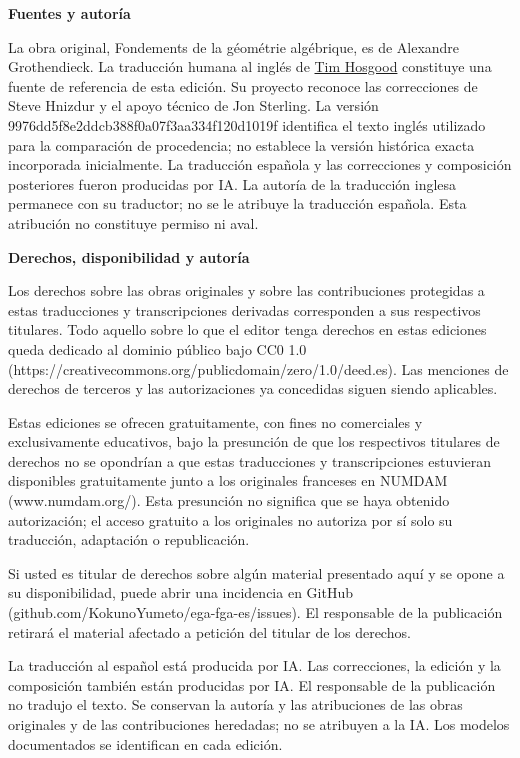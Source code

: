 \documentclass[11pt,twoside,openany]{book}
\numberwithin{equation}{section}
\theoremstyle{plain}
\theoremstyle{definition}
\theoremstyle{remark}
\theoremstyle{plain}
\theoremstyle{definition}
\theoremstyle{remark}
\begin{document}
\begingroup
\small
\noindent\textbf{Fuentes y autoría}

La obra original, Fondements de la géométrie algébrique, es de Alexandre Grothendieck. La traducción humana al inglés de \href{https://github.com/thosgood/fga/tree/9976dd5f8e2ddcb388f0a07f3aa334f120d1019f}{Tim Hosgood} constituye una fuente de referencia de esta edición. Su proyecto reconoce las correcciones de Steve Hnizdur y el apoyo técnico de Jon Sterling. La versión 9976dd5f8e2ddcb388f0a07f3aa334f120d1019f identifica el texto inglés utilizado para la comparación de procedencia; no establece la versión histórica exacta incorporada inicialmente. La traducción española y las correcciones y composición posteriores fueron producidas por IA. La autoría de la traducción inglesa permanece con su traductor; no se le atribuye la traducción española. Esta atribución no constituye permiso ni aval.

\noindent\textbf{Derechos, disponibilidad y autoría}

Los derechos sobre las obras originales y sobre las contribuciones protegidas a estas traducciones y transcripciones derivadas corresponden a sus respectivos titulares. Todo aquello sobre lo que el editor tenga derechos en estas ediciones queda dedicado al dominio público bajo CC0 1.0 (https://creativecommons.org/publicdomain/zero/1.0/deed.es). Las menciones de derechos de terceros y las autorizaciones ya concedidas siguen siendo aplicables.

Estas ediciones se ofrecen gratuitamente, con fines no comerciales y exclusivamente educativos, bajo la presunción de que los respectivos titulares de derechos no se opondrían a que estas traducciones y transcripciones estuvieran disponibles gratuitamente junto a los originales franceses en NUMDAM (www.numdam.org/). Esta presunción no significa que se haya obtenido autorización; el acceso gratuito a los originales no autoriza por sí solo su traducción, adaptación o republicación.

Si usted es titular de derechos sobre algún material presentado aquí y se opone a su disponibilidad, puede abrir una incidencia en GitHub (github.com/KokunoYumeto/ega-fga-es/issues). El responsable de la publicación retirará el material afectado a petición del titular de los derechos.

La traducción al español está producida por IA. Las correcciones, la edición y la composición también están producidas por IA. El responsable de la publicación no tradujo el texto. Se conservan la autoría y las atribuciones de las obras originales y de las contribuciones heredadas; no se atribuyen a la IA. Los modelos documentados se identifican en cada edición.
\par
\endgroup
\clearpage
\end{document}

